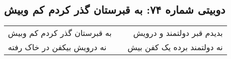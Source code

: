 \begin{center}
\section*{دوبیتی شماره ۷۴: به قبرستان گذر کردم کم وبیش}
\label{sec:074}
\begin{longtable}{l p{0.5cm} r}
به قبرستان گذر کردم کم وبیش
&&
بدیدم قبر دولتمند و درویش
\\
نه درویش بیکفن در خاک رفته
&&
نه دولتمند برده یک کفن بیش
\\
\end{longtable}
\end{center}
